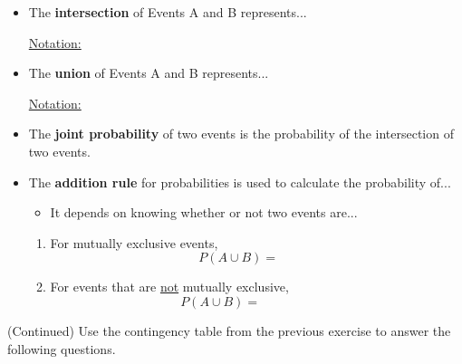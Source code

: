 \documentclass[12pt, letterpaper]{article}
\newcounter{exercise}
\theoremstyle{definition}
\begin{document}
\newpage


\begin{defn}
\begin{itemize}

\item The \textbf{intersection} of Events A and B represents...
\vspace*{.7in}

\underline{Notation:}
\vspace*{.2in}

\item The \textbf{union} of Events A and B represents...
\vspace*{.7in}

\underline{Notation:}
\vspace*{.2in}


\end{itemize}
\end{defn}


\begin{defn}
\begin{itemize}
\item The \textbf{joint probability} of two events is the probability of the intersection of two events.

\item The \textbf{addition rule} for probabilities is used to calculate the probability of...
\vspace*{.5in}

\begin{itemize}
\item It depends on knowing whether or not two events are...
\vspace*{.5in}
\end{itemize}

\begin{enumerate}
\item For mutually exclusive events,
$$ P(A\cup B) = ~~~~~~~~~~~~~ $$
\item For events that are \underline{not} mutually exclusive, 
$$ P(A\cup B)=~~~~~~~~~~~~~~~~~~~~~~~~~~ $$
\end{enumerate}

\end{itemize}
\end{defn}


\begin{exercise} (Continued)
Use the contingency table from the previous exercise to answer the following questions.
\end{exercise}
\end{document}
